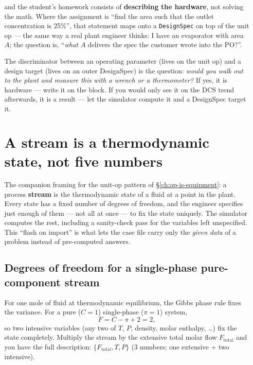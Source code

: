 \documentclass[11pt,a4paper]{article}
\begin{document}
\noindent and the student's homework consists of
\textbf{describing the hardware}, not solving the math.  Where
the assignment is ``find the area such that the outlet
concentration is 25\%'', that statement maps onto a
\texttt{DesignSpec} on top of the unit op --- the same way a
real plant engineer thinks: I have an evaporator with area $A$;
the question is, ``\emph{what} $A$ delivers the spec the customer
wrote into the PO?''.

\begin{intuition}
The discriminator between an operating parameter (lives on the
unit op) and a design target (lives on an outer DesignSpec) is
the question: \emph{would you walk out to the plant and measure
this with a wrench or a thermometer?}  If yes, it is hardware ---
write it on the block.  If you would only see it on the DCS
trend afterwards, it is a result --- let the simulator compute
it and a DesignSpec target it.
\end{intuition}

\section{A stream is a thermodynamic state, not five numbers}\label{ch:stream-as-state}

\begin{whatyoulllearn}
The companion framing for the unit-op pattern of
\S\ref{ch:op-is-equipment}: a process \textbf{stream} is the
thermodynamic state of a fluid at a point in the plant.  Every
state has a fixed number of degrees of freedom, and the engineer
specifies just enough of them --- not all at once --- to fix the
state uniquely.  The simulator computes the rest, including a
sanity-check pass for the variables left unspecified.  This
``flash on import'' is what lets the case file carry only the
\emph{given data} of a problem instead of pre-computed answers.
\end{whatyoulllearn}

\subsection{Degrees of freedom for a single-phase pure-component stream}

For one mole of fluid at thermodynamic equilibrium, the Gibbs
phase rule fixes the variance.  For a pure ($C=1$) single-phase
($\pi=1$) system,
\[
   F = C - \pi + 2 = 2,
\]
so two intensive variables (any two of $T$, $P$, density, molar
enthalpy, \ldots) fix the state completely.  Multiply the stream
by the extensive total molar flow $F_{\mathrm{total}}$ and you
have the full description: $\{F_{\mathrm{total}}, T, P\}$ (3
numbers; one extensive + two intensive).
\end{document}
